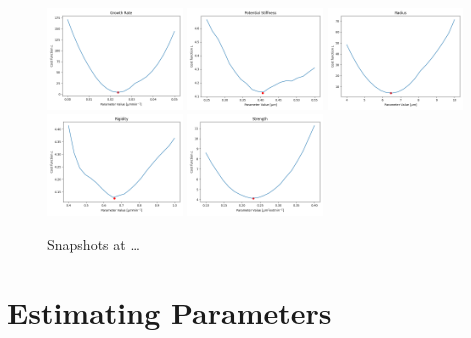 \documentclass{article}
\begin{document}
\begin{figure}
    \centering
    \includegraphics[width=0.32\textwidth]
        {../docs/source/_static/fitting-methods/estimate-parameters1/Growth Rate.png}%
    \includegraphics[width=0.32\textwidth]
        {../docs/source/_static/fitting-methods/estimate-parameters1/Potential Stiffness.png}%
    \includegraphics[width=0.32\textwidth]
        {../docs/source/_static/fitting-methods/estimate-parameters1/Radius.png}\\%
    \includegraphics[width=0.32\textwidth]
        {../docs/source/_static/fitting-methods/estimate-parameters1/Rigidity.png}%
    \includegraphics[width=0.32\textwidth]
        {../docs/source/_static/fitting-methods/estimate-parameters1/Strength.png}%
    \caption{Snapshots at \dots}
    \label{fig:parameter-estimates-single-step}
\end{figure}

\section{Estimating Parameters}
\label{section:parameter-estimation}




\end{document}
